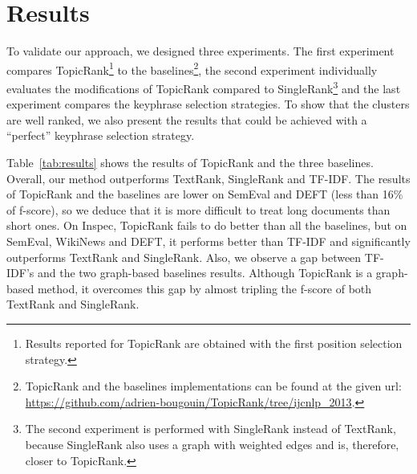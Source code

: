 \section{Results}
\label{sec:results}
  To validate our approach, we designed three experiments. The first experiment
  compares TopicRank\footnote{Results reported for TopicRank are obtained with
  the first position selection strategy.} to the baselines\footnote{TopicRank
  and the baselines implementations can be found at the given url:
  \url{https://github.com/adrien-bougouin/TopicRank/tree/ijcnlp_2013}.}, the
  second experiment individually evaluates the modifications of TopicRank
  compared to SingleRank\footnote{The second experiment is performed with
  SingleRank instead of TextRank, because SingleRank also uses a graph with
  weighted edges and is, therefore, closer to TopicRank.} and the last
  experiment compares the keyphrase selection strategies. To show that the
  clusters are well ranked, we also present the results that could be achieved
  with a ``perfect'' keyphrase selection strategy.

  Table~\ref{tab:results} shows the results of TopicRank and the three
  baselines. Overall, our method outperforms TextRank, SingleRank and TF-IDF.
  The results of TopicRank and the baselines are lower on SemEval and DEFT (less
  than 16\% of f-score), so we deduce that it is more difficult to treat long
  documents than short ones. On Inspec, TopicRank fails to do better than all
  the baselines, but on SemEval, WikiNews and DEFT, it performs better than
  TF-IDF and significantly outperforms TextRank and SingleRank. Also, we observe
  a gap between TF-IDF's and the two graph-based baselines results. Although
  TopicRank is a graph-based method, it overcomes this gap by almost tripling
  the f-score of both TextRank and SingleRank.

